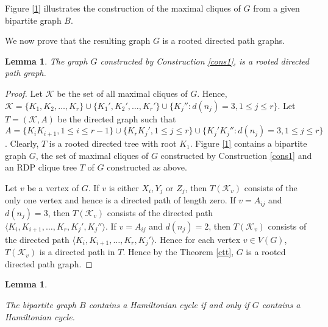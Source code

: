 \documentclass[a4paper,12pt]{article}
\theoremstyle{plain}
\newtheorem{lemma}[theorem]{Lemma}
\theoremstyle{definition}
\theoremstyle{remark}
\begin{document}
Figure \ref{1} illustrates the construction of the maximal cliques
of $G$ from a given bipartite graph $B$.

We now prove that the resulting graph $G$ is a rooted directed path
graphs.

\begin{lemma}\label{lemma1}
The graph $G$ constructed by Construction \ref{cons1}, is a rooted
directed path graph.

\end{lemma}


\begin{proof}

Let $\mathscr{K}$ be the set of all maximal cliques of $G$. Hence,
 $\mathscr{K}=\{K_1,K_2,\ldots, K_r\} \cup \{K_1',K_2',\ldots,K_r'\} \cup \{K_j'' :
d(n_j)=3, 1 \leq j \leq r \}$.  Let $T=(\mathscr{K}, A)$ be the
directed graph such that $A= \{K_iK_{i+1}, 1 \leq i \leq r-1\} \cup
\{K_rK_j', 1 \leq j \leq r\} \cup \{K_j'K_j'':  d(n_j)=3, 1 \leq j
\leq r\}$. Clearly, $T$ is a rooted directed tree with root $K_1$.
Figure \ref{1} contains a bipartite graph $G$, the set of maximal
cliques of $G$ constructed by Construction \ref{cons1} and an RDP
clique tree $T$ of  $G$ constructed as above.






\begin{figure}
\centerline{\hbox{}}
\end{figure}

Let $v$ be a vertex of $G$. If $v$ is either $X_i,Y_j$ or $Z_j$,
then $T(\mathscr{K}_v)$ consists of the only one vertex and hence is
a directed path of length zero. If $v=A_{ij}$ and $d(n_j)=3$, then
$T(\mathscr{K}_v)$ consists of the directed path $\langle K_i,
K_{i+1},\ldots, K_r, K_j', K_j'' \rangle$. If $v=A_{ij}$ and
$d(n_j)=2$, then $T(\mathscr{K}_v)$ consists of the directed path
$\langle K_i, K_{i+1},\ldots, K_r,K_j' \rangle$. Hence for each
vertex $v\in V(G)$, $T(\mathscr{K}_v)$ is a directed path in $T$.
Hence by the Theorem \ref {ctt}, $G$ is a rooted directed path
graph.
\end{proof}

\begin{lemma}\label{lemma2}

The bipartite graph $B$ contains a Hamiltonian cycle if and only if
 $G$ contains a Hamiltonian cycle.

\end{lemma}
\end{document}
